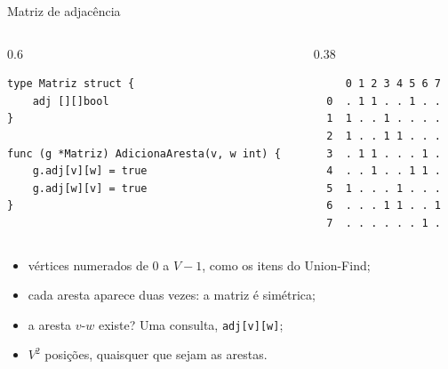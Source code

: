 \documentclass{beamer}
\begin{document}
\begin{frame}[fragile]{Matriz de adjacência}
	\begin{columns}[T]
		\begin{column}{0.6\textwidth}
			\begin{verbatim}
type Matriz struct {
	adj [][]bool
}

func (g *Matriz) AdicionaAresta(v, w int) {
	g.adj[v][w] = true
	g.adj[w][v] = true
}
\end{verbatim}
		\end{column}
		\begin{column}{0.38\textwidth}
			\begin{verbatim}
     0 1 2 3 4 5 6 7
  0  . 1 1 . . 1 . .
  1  1 . . 1 . . . .
  2  1 . . 1 1 . . .
  3  . 1 1 . . . 1 .
  4  . . 1 . . 1 1 .
  5  1 . . . 1 . . .
  6  . . . 1 1 . . 1
  7  . . . . . . 1 .
\end{verbatim}
		\end{column}
	\end{columns}

	\begin{itemize}
		\item vértices numerados de 0 a $V-1$, como os itens do Union-Find;
		\item cada aresta aparece duas vezes: a matriz é simétrica;
		\item a aresta $v$-$w$ existe? Uma consulta, \texttt{adj[v][w]};
		\item $V^2$ posições, quaisquer que sejam as arestas.
	\end{itemize}
\end{frame}
\end{document}
